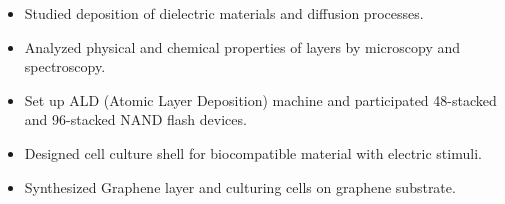 \documentclass[10pt,a4paper,ragged2e]{altacv}
\begin{document}

\begin{fullwidth}
\makecvheader
\end{fullwidth}


\begin{itemize}
\item Studied deposition of dielectric materials and diffusion processes. 
\item Analyzed physical and chemical properties of layers by microscopy and spectroscopy. 
\item Set up ALD (Atomic Layer Deposition) machine and participated 48-stacked and 96-stacked NAND flash devices.


\end{itemize}

\divider%

\begin{itemize}
\item Designed cell culture shell for biocompatible material with electric stimuli.
\item Synthesized Graphene layer and culturing cells on graphene substrate.
\end{itemize}
\end{document}
